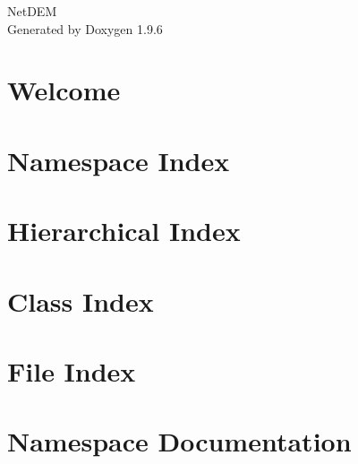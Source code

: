 \documentclass[twoside]{book}
\newcommand{\+}{\discretionary{\mbox{\scriptsize$\hookleftarrow$}}{}{}}
\newcommand{\clearemptydoublepage}{%
    \newpage{\pagestyle{empty}\cleardoublepage}%
  }
\begin{document}
  \raggedbottom
    \hypersetup{pageanchor=false,
                bookmarksnumbered=true,
                pdfencoding=unicode
               }
  \begin{titlepage}
  \vspace*{7cm}
  \begin{center}%
  {\Large Net\+DEM}\\
  \vspace*{1cm}
  {\large Generated by Doxygen 1.9.6}\\
  \end{center}
  \end{titlepage}
  \clearemptydoublepage
  \tableofcontents
  \clearemptydoublepage
  \hypersetup{pageanchor=true}
\chapter{Welcome}
\label{index}\hypertarget{index}{}
\chapter{Namespace Index}

\chapter{Hierarchical Index}

\chapter{Class Index}

\chapter{File Index}

\chapter{Namespace Documentation}


\end{document}

